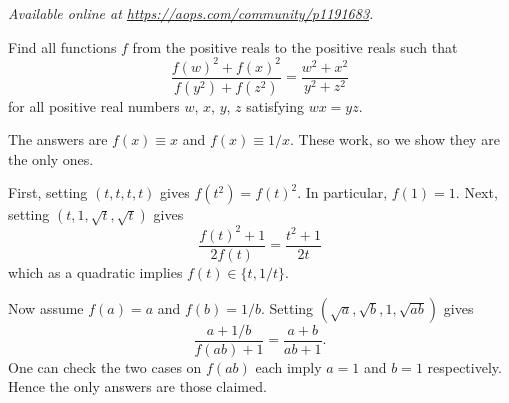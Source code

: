 \textsl{Available online at \url{https://aops.com/community/p1191683}.}
\begin{mdframed}[style=mdpurplebox,frametitle={Problem statement}]
Find all functions $f$ from the positive reals to the positive reals such that
\[ \frac{f(w)^2 + f(x)^2}{f(y^2)+f(z^2)} = \frac{w^2+x^2}{y^2+z^2} \]
for all positive real numbers $w$, $x$, $y$, $z$ satisfying $wx=yz$.
\end{mdframed}
The answers are $f(x) \equiv x$ and $f(x) \equiv 1/x$.
These work, so we show they are the only ones.

First, setting $(t,t,t,t)$ gives $f(t^2) = f(t)^2$.
In particular, $f(1) = 1$.
Next, setting $(t, 1, \sqrt t, \sqrt t)$ gives
\[ \frac{f(t)^2 + 1}{2f(t)} = \frac{t^2 + 1}{2t} \]
which as a quadratic implies $f(t) \in \{t, 1/t\}$.

Now assume $f(a) = a$ and $f(b) = 1/b$.
Setting $(\sqrt a, \sqrt b, 1, \sqrt{ab})$ gives
\[ \frac{a + 1/b}{f(ab) + 1} = \frac{a+b}{ab+1}. \]
One can check the two cases on $f(ab)$ each imply
$a=1$ and $b=1$ respectively.
Hence the only answers are those claimed.
\pagebreak